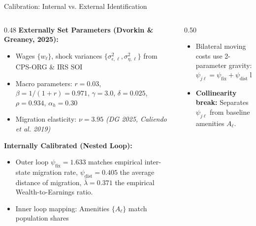 \documentclass[aspectratio=169, 10pt]{beamer}
\begin{document}
\begin{frame}{Calibration: Internal vs. External Identification \hfill \hyperlink{backup:data_sources}{\scriptsize{}} \hyperlink{backup:param_table}{\scriptsize{}}}\label{main:calibration}
    \begin{columns}[T]
        \begin{column}{0.48\textwidth}
            \textbf{Externally Set Parameters (Dvorkin \& Greaney, 2025):}
            \begin{itemize}\small\setlength{\itemsep}{1pt}
                \item Wages $\{w_\ell\}$, shock variances $\{\sigma_{\epsilon,\ell}^2, \sigma_{\eta,\ell}^2\}$ from CPS-ORG \& IRS SOI
                \item Macro parameters: $r = 0.03$, $\beta = 1/(1+r) = 0.971$, $\gamma = 3.0$, $\delta = 0.025$, $\rho = 0.934$, $\alpha_h = 0.30$
                \item Migration elasticity: $\nu = 3.95$ \textit{(DG 2025, Caliendo et al. 2019)}
            \end{itemize}
            \vspace{0.06cm}
            \textbf{Internally Calibrated (Nested Loop):}
            \begin{itemize}\small\setlength{\itemsep}{1pt}
                \item Outer loop $\psi_{\text{fix}} = 1.633$ matches empirical inter-state migration rate, $\psi_{\text{dist}} = 0.405$ the average distance of migration, $\bar{\lambda} = 0.371$ the empirical Wealth-to-Earnings ratio.
                \item Inner loop mapping: Amenities $\{A_\ell\}$ match population shares
            \end{itemize}
        \end{column}
        \begin{column}{0.50\textwidth}
            \begin{tcolorbox}[leafbox, title=The Identification Challenge of $\nu$]
                \footnotesize
                \begin{itemize}\setlength{\itemsep}{1.5pt}
                    \item Bilateral moving costs use 2-parameter gravity:
                    $$\psi_{j\ell} = \psi_{\text{fix}} + \psi_{\text{dist}} \ln(1 + d_{j\ell})$$
                    \item \textbf{Collinearity break:} Separates $\psi_{j\ell}$ from baseline amenities $A_\ell$.

\end{itemize}
\end{tcolorbox}
\end{column}
\end{columns}
\end{frame}
\end{document}
